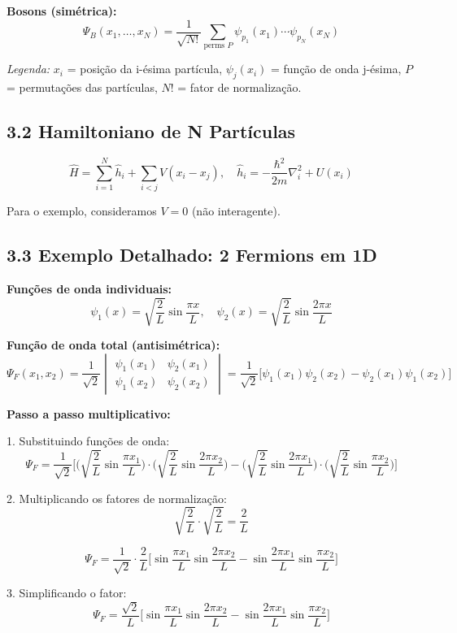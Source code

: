 \documentclass[12pt,a4paper]{article}
\begin{document}
\textbf{Bosons (simétrica):}
\[
\Psi_B(x_1, \dots, x_N) = \frac{1}{\sqrt{N!}} \sum_{\text{perms } P} \psi_{p_1}(x_1)\cdots \psi_{p_N}(x_N)
\]

\textit{Legenda:} \(x_i\) = posição da i-ésima partícula, \(\psi_j(x_i)\) = função de onda j-ésima, \(P\) = permutações das partículas, \(N!\) = fator de normalização.

\subsection*{3.2 Hamiltoniano de N Partículas}
\[
\hat{H} = \sum_{i=1}^{N} \hat{h}_i + \sum_{i<j} V(x_i - x_j), \quad
\hat{h}_i = -\frac{\hbar^2}{2m} \nabla_i^2 + U(x_i)
\]

Para o exemplo, consideramos \(V=0\) (não interagente).

\subsection*{3.3 Exemplo Detalhado: 2 Fermions em 1D}

\textbf{Funções de onda individuais:}
\[
\psi_1(x) = \sqrt{\frac{2}{L}} \sin\frac{\pi x}{L}, \quad
\psi_2(x) = \sqrt{\frac{2}{L}} \sin\frac{2 \pi x}{L}
\]

\textbf{Função de onda total (antisimétrica):}
\[
\Psi_F(x_1, x_2) = \frac{1}{\sqrt{2}} 
\begin{vmatrix}
\psi_1(x_1) & \psi_2(x_1) \\
\psi_1(x_2) & \psi_2(x_2)
\end{vmatrix}
= \frac{1}{\sqrt{2}} \big[ \psi_1(x_1)\psi_2(x_2) - \psi_2(x_1)\psi_1(x_2) \big]
\]

\textbf{Passo a passo multiplicativo:}

1. Substituindo funções de onda:
\[
\Psi_F = \frac{1}{\sqrt{2}} \Big[ 
\big(\sqrt{\frac{2}{L}} \sin\frac{\pi x_1}{L}\big) 
\cdot 
\big(\sqrt{\frac{2}{L}} \sin\frac{2 \pi x_2}{L}\big) 
-
\big(\sqrt{\frac{2}{L}} \sin\frac{2 \pi x_1}{L}\big) 
\cdot 
\big(\sqrt{\frac{2}{L}} \sin\frac{\pi x_2}{L}\big) 
\Big]
\]

2. Multiplicando os fatores de normalização:
\[
\sqrt{\frac{2}{L}} \cdot \sqrt{\frac{2}{L}} = \frac{2}{L}
\]

\[
\Psi_F = \frac{1}{\sqrt{2}} \cdot \frac{2}{L} 
\Big[ \sin\frac{\pi x_1}{L} \sin\frac{2 \pi x_2}{L} - \sin\frac{2 \pi x_1}{L} \sin\frac{\pi x_2}{L} \Big]
\]

3. Simplificando o fator:
\[
\Psi_F = \frac{\sqrt{2}}{L} \Big[ \sin\frac{\pi x_1}{L} \sin\frac{2 \pi x_2}{L} - \sin\frac{2 \pi x_1}{L} \sin\frac{\pi x_2}{L} \Big]
\]
\end{document}
